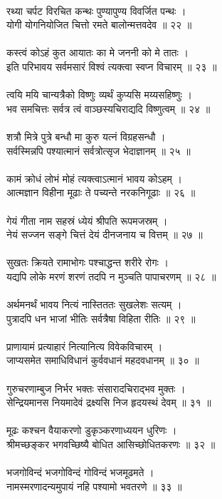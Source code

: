 \\
रथ्या चर्पट विरचित कन्थः पुण्यापुण्य विवर्जित पन्थः ।\\
योगी योगनियोजित चित्तो रमते बालोन्मत्तवदेव ॥ २२ ॥\\
\\
कस्त्वं कोऽहं कुत आयातः का मे जननी को मे तातः ।\\
इति परिभावय सर्वमसारं विश्वं त्यक्त्वा स्वप्न विचारम् ॥ २३ ॥\\
\\
त्वयि मयि चान्यत्रैको विष्णुः व्यर्थं कुप्यसि मय्यसहिष्णुः ।\\
भव समचित्तः सर्वत्र त्वं वाञ्छस्यचिराद्यदि विष्णुत्वम् ॥ २४ ॥\\
\\
शत्रौ मित्रे पुत्रे बन्धौ मा कुरु यत्नं विग्रहसन्धौ ।\\
सर्वस्मिन्नपि पश्यात्मानं सर्वत्रोत्सृज भेदाज्ञानम् ॥ २५ ॥\\
\\
कामं क्रोधं लोभं मोहं त्यक्त्वाऽत्मानं भावय कोऽहम् ।\\
आत्मज्ञान विहीना मूढाः ते पच्यन्ते नरकनिगूढाः ॥ २६ ॥\\
\\
गेयं गीता नाम सहस्रं ध्येयं श्रीपति रूपमजस्रम् ।\\
नेयं सज्जन सङ्गे चित्तं देयं दीनजनाय च वित्तम् ॥ २७ ॥\\
\\
सुखतः क्रियते रामाभोगः पश्चाद्धन्त शरीरे रोगः ।\\
यद्यपि लोके मरणं शरणं तदपि न मुञ्चति पापाचरणम् ॥ २८ ॥\\
\\
अर्थमनर्थं भावय नित्यं नास्तिततः सुखलेशः सत्यम् ।\\
पुत्रादपि धन भाजां भीतिः सर्वत्रैषा विहिता रीतिः ॥ २९ ॥\\
\\
प्राणायामं प्रत्याहारं नित्यानित्य विवेकविचारम् ।\\
जाप्यसमेत समाधिविधानं कुर्ववधानं महदवधानम् ॥ ३० ॥\\
\\
गुरुचरणाम्बुज निर्भर भक्तः संसारादचिराद्भव मुक्तः ।\\
सेन्द्रियमानस नियमादेवं द्रक्ष्यसि निज हृदयस्थं देवम् ॥ ३१ ॥\\
\\
मूढः कश्चन वैयाकरणो डुकृञ्करणाध्ययन धुरिणः ।\\
श्रीमच्छङ्कर भगवच्छिष्यै बोधित आसिच्छोधितकरणः ॥ ३२ ॥\\
\\
भजगोविन्दं भजगोविन्दं गोविन्दं भजमूढमते ।\\
नामस्मरणादन्यमुपायं नहि पश्यामो भवतरणे ॥ ३३ ॥\\